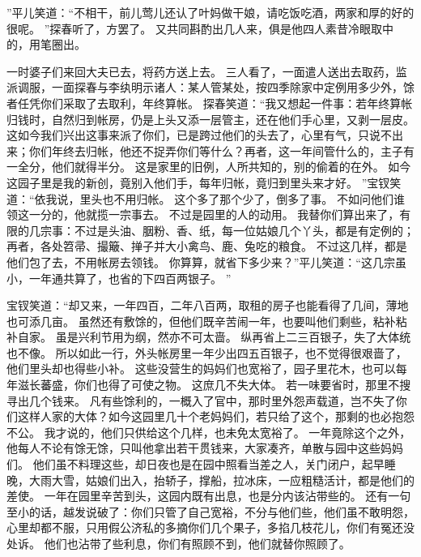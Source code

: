 ”平儿笑道：“不相干，前儿莺儿还认了叶妈做干娘，请吃饭吃酒，两家和厚的好的很呢。
”探春听了，方罢了。
又共同斟酌出几人来，俱是他四人素昔冷眼取中的，用笔圈出。
\par
一时婆子们来回大夫已去，将药方送上去。
三人看了，一面遣人送出去取药，监派调服，一面探春与李纨明示诸人：某人管某处，按四季除家中定例用多少外，馀者任凭你们采取了去取利，年终算帐。
探春笑道：“我又想起一件事：若年终算帐归钱时，自然归到帐房，仍是上头又添一层管主，还在他们手心里，又剥一层皮。
这如今我们兴出这事来派了你们，已是跨过他们的头去了，心里有气，只说不出来；你们年终去归帐，他还不捉弄你们等什么？再者，这一年间管什么的，主子有一全分，他们就得半分。
这是家里的旧例，人所共知的，别的偷着的在外。
如今这园子里是我的新创，竟别入他们手，每年归帐，竟归到里头来才好。
”宝钗笑道：“依我说，里头也不用归帐。
这个多了那个少了，倒多了事。
不如问他们谁领这一分的，他就揽一宗事去。
不过是园里的人的动用。
我替你们算出来了，有限的几宗事：不过是头油、胭粉、香、纸，每一位姑娘几个丫头，都是有定例的；再者，各处笤帚、撮簸、掸子并大小禽鸟、鹿、兔吃的粮食。
不过这几样，都是他们包了去，不用帐房去领钱。
你算算，就省下多少来？”平儿笑道：“这几宗虽小，一年通共算了，也省的下四百两银子。
”\par
宝钗笑道：“却又来，一年四百，二年八百两，取租的房子也能看得了几间，薄地也可添几亩。
虽然还有敷馀的，但他们既辛苦闹一年，也要叫他们剩些，粘补粘补自家。
虽是兴利节用为纲，然亦不可太啬。
纵再省上二三百银子，失了大体统也不像。
所以如此一行，外头帐房里一年少出四五百银子，也不觉得很艰啬了，他们里头却也得些小补。
这些没营生的妈妈们也宽裕了，园子里花木，也可以每年滋长蕃盛，你们也得了可使之物。
这庶几不失大体。
若一味要省时，那里不搜寻出几个钱来。
凡有些馀利的，一概入了官中，那时里外怨声载道，岂不失了你们这样人家的大体？如今这园里几十个老妈妈们，若只给了这个，那剩的也必抱怨不公。
我才说的，他们只供给这个几样，也未免太宽裕了。
一年竟除这个之外，他每人不论有馀无馀，只叫他拿出若干贯钱来，大家凑齐，单散与园中这些妈妈们。
他们虽不料理这些，却日夜也是在园中照看当差之人，关门闭户，起早睡晚，大雨大雪，姑娘们出入，抬轿子，撑船，拉冰床，一应粗糙活计，都是他们的差使。
一年在园里辛苦到头，这园内既有出息，也是分内该沾带些的。
还有一句至小的话，越发说破了：你们只管了自己宽裕，不分与他们些，他们虽不敢明怨，心里却都不服，只用假公济私的多摘你们几个果子，多掐几枝花儿，你们有冤还没处诉。
他们也沾带了些利息，你们有照顾不到，他们就替你照顾了。
